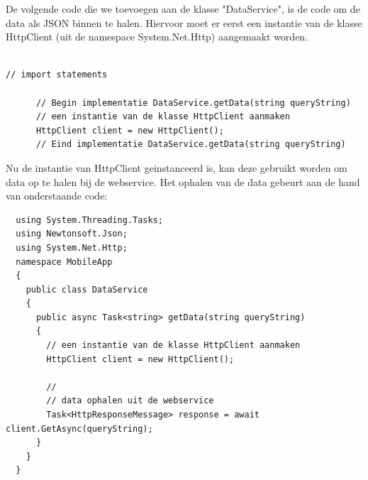 De volgende code die we toevoegen aan de klasse "DataService", is de code om de data als JSON binnen te halen.
Hiervoor moet er eerst een instantie van de klasse HttpClient (uit de namespace System.Net.Http) aangemaakt worden.
\begin{lstlisting}

// import statements

      // Begin implementatie DataService.getData(string queryString)
      // een instantie van de klasse HttpClient aanmaken
      HttpClient client = new HttpClient();
      // Eind implementatie DataService.getData(string queryString)

\end{lstlisting}
Nu de instantie van HttpClient geinstanceerd is, kan deze gebruikt worden om data op te halen bij de webservice.
Het ophalen van de data gebeurt aan de hand van onderstaande code:
\begin{lstlisting}
  using System.Threading.Tasks;
  using Newtonsoft.Json;
  using System.Net.Http;
  namespace MobileApp
  {
    public class DataService
    {
      public async Task<string> getData(string queryString)
      {
        // een instantie van de klasse HttpClient aanmaken
        HttpClient client = new HttpClient();

        //
        // data ophalen uit de webservice
        Task<HttpResponseMessage> response = await client.GetAsync(queryString);
      }
    }
  }
\end{lstlisting}

